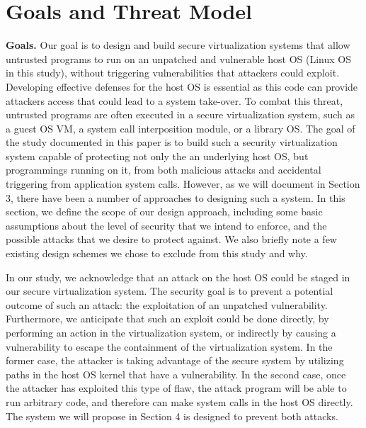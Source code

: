 \section{Goals and Threat Model}
\label{sec.motivation-and-background}

\textbf{Goals.}
Our goal is to design and build secure virtualization systems that allow
untrusted programs to run on an unpatched and vulnerable host OS (Linux OS in
 this study), without triggering vulnerabilities that attackers could exploit.
 Developing effective defenses for the host OS is essential as this code
 can provide attackers access that could lead to a system take-over.
To combat this threat, untrusted programs are often executed in a secure
 virtualization system, such as a guest OS VM, a system call interposition
 module, or a library OS. The goal of the study documented in this paper is to
build such a security virtualization system capable of protecting not only the
an underlying host OS, but programmings running on it, from both malicious attacks
and accidental triggering from application system calls. However, as we will document
 in Section 3, there have been a number of approaches to designing such a system.
In this section, we define the scope of our design approach, including some basic
assumptions about the level of security that we intend to enforce,
and the possible attacks that we desire to protect against. We also briefly note
a few existing design schemes we chose to exclude from this study and why.

In our study, we acknowledge that an attack on the host OS could be staged in our secure
virtualization system. The security goal is to prevent a potential outcome of such
an attack: the exploitation of an unpatched vulnerability. Furthermore, we
anticipate that such an exploit could be done directly, by performing an action in the
virtualization system, or indirectly by causing a vulnerability to escape the
containment of the virtualization system.  In the former case, the attacker is
taking advantage of the secure system by utilizing paths in the host OS kernel
that have a vulnerability. In the second case, once the attacker has exploited
this type of flaw, the attack program will be able to run arbitrary code, and
therefore can make system calls in the host OS directly. The system we will propose
in Section 4 is designed to prevent both attacks.


